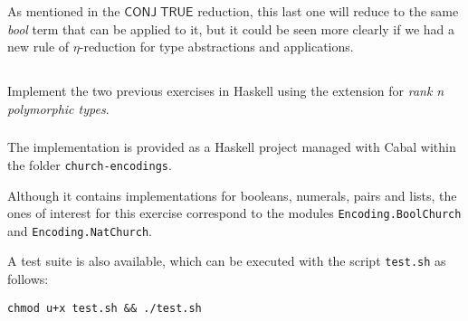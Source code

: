 \documentclass{article}
\begin{document}
As mentioned in the $\mathsf{CONJ}\;\mathsf{TRUE}$ reduction,
this last one will reduce to the same \textit{bool} term 
that can be applied to it, but it could be seen more clearly 
if we had a new rule of $\eta$-reduction for type 
abstractions and applications.

\subsection{}\label{ex:8}

Implement the two previous exercises in Haskell using the 
extension for \textit{rank n polymorphic types}. 

\subsubsection{}

The implementation is provided as a Haskell project
managed with Cabal within the folder \verb|church-encodings|.

Although it contains implementations for booleans, numerals, 
pairs and lists, the ones of interest for this exercise 
correspond to the modules \verb|Encoding.BoolChurch|
and \verb|Encoding.NatChurch|.

A test suite is also available, which can be executed with the 
script \verb|test.sh| as follows:

\begin{verbatim}
chmod u+x test.sh && ./test.sh
\end{verbatim}
\end{document}
